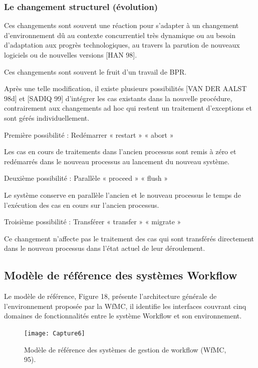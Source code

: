 \subsubsection{Le changement structurel (évolution) }
Ces changements sont souvent une réaction pour s’adapter à un changement
d’environnement dû au contexte concurrentiel très dynamique ou au besoin d’adaptation aux
progrès technologiques, au travers la parution de nouveaux logiciels ou de nouvelles versions
[HAN 98].

Ces changements sont souvent le fruit d’un travail de BPR.

Après une telle modification, il existe plusieurs possibilités [VAN DER AALST 98d] et [SADIQ 99] d’intégrer les cas existants dans la nouvelle procédure, contrairement aux changements ad hoc qui restent un traitement d’exceptions et sont gérés individuellement.

Première possibilité : Redémarrer « restart » « abort »

Les cas en cours de traitements dans l’ancien processus sont remis à zéro et redémarrés
dans le nouveau processus au lancement du nouveau système.

Deuxième possibilité : Parallèle « proceed » « flush »

Le système conserve en parallèle l’ancien et le nouveau processus le temps de l’exécution
des cas en cours sur l’ancien processus.

Troisième possibilité : Transférer « transfer » « migrate »

Ce changement n’affecte pas le traitement des cas qui sont transférés directement dans le
nouveau processus dans l’état actuel de leur déroulement. 



\subsection{Modèle de référence des systèmes Workflow }

Le modèle de référence, Figure 18, présente l’architecture générale de l’environnement
proposée par la WfMC, il identifie les interfaces couvrant cinq domaines de fonctionnalités entre le système Workflow et son environnement. 

\begin{figure}[h]
	\centering
	\texttt{[image: Capture6]}
	\caption{ Modèle de référence des systèmes de gestion de workflow (WfMC, 95). }
	\label{fig:capture6}
\end{figure}



